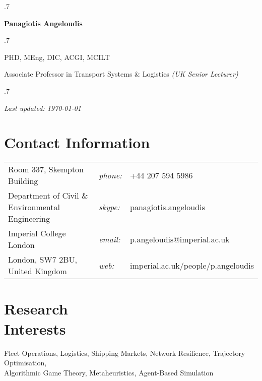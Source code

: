 \documentclass[margin]{res}
\begin{document}
\moveleft.7\hoffset\centerline{\LARGE\bf Panagiotis Angeloudis}

\vspace{.05in}\moveleft.7\hoffset\centerline{\small PHD, MEng, DIC, ACGI, MCILT}

\vspace{.1in}
\hoffset\centerline{\large{Associate Professor in Transport Systems \& Logistics} \textit{\small{(UK Senior Lecturer)}}}

\begin{resume}
\vspace{-.1in}
\moveleft.7\hoffset\centerline{\small\textit{Last updated: \today}}

\section{\sc Contact Information}
\begin{tabular}{@{}p{3in}p{0.3in}p{3in}}

Room 337, Skempton Building                       & {\it phone:} & +44 207 594 5986  \\
Department of Civil \& Environmental Engineering  & {\it skype:} & panagiotis.angeloudis \\
Imperial College London                           & {\it email:} & p.angeloudis@imperial.ac.uk\\
London, SW7 2BU, United Kingdom                   & {\it web:}   & imperial.ac.uk/people/p.angeloudis \\     

\end{tabular}

\section{\sc Research\\ Interests}
Fleet Operations, Logistics, Shipping Markets, Network Resilience, Trajectory Optimisation, \\
Algorithmic Game Theory, Metaheuristics, Agent-Based Simulation


\end{resume}
\end{document}
